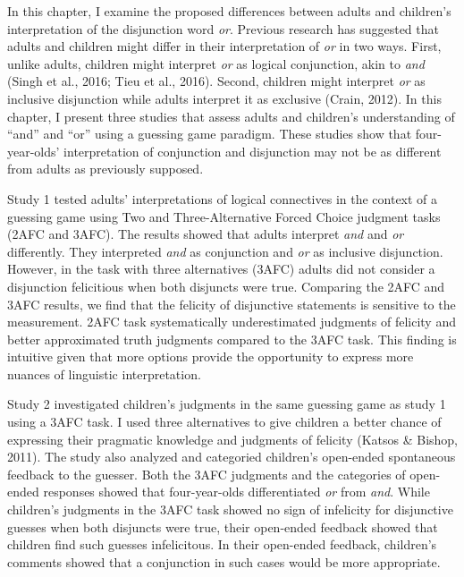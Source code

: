\documentclass[oneside]{report}
\theoremstyle{definition}
\theoremstyle{definition}
\theoremstyle{definition}
\theoremstyle{remark}
\begin{document}
In this chapter, I examine the proposed differences between adults and
children's interpretation of the disjunction word \emph{or}. Previous
research has suggested that adults and children might differ in their
interpretation of \emph{or} in two ways. First, unlike adults, children
might interpret \emph{or} as logical conjunction, akin to \emph{and}
(Singh et al., 2016; Tieu et al., 2016). Second, children might
interpret \emph{or} as inclusive disjunction while adults interpret it
as exclusive (Crain, 2012). In this chapter, I present three studies
that assess adults and children's understanding of ``and'' and ``or''
using a guessing game paradigm. These studies show that four-year-olds'
interpretation of conjunction and disjunction may not be as different
from adults as previously supposed.

Study 1 tested adults' interpretations of logical connectives in the
context of a guessing game using Two and Three-Alternative Forced Choice
judgment tasks (2AFC and 3AFC). The results showed that adults interpret
\emph{and} and \emph{or} differently. They interpreted \emph{and} as
conjunction and \emph{or} as inclusive disjunction. However, in the task
with three alternatives (3AFC) adults did not consider a disjunction
felicitious when both disjuncts were true. Comparing the 2AFC and 3AFC
results, we find that the felicity of disjunctive statements is
sensitive to the measurement. 2AFC task systematically underestimated
judgments of felicity and better approximated truth judgments compared
to the 3AFC task. This finding is intuitive given that more options
provide the opportunity to express more nuances of linguistic
interpretation.

Study 2 investigated children's judgments in the same guessing game as
study 1 using a 3AFC task. I used three alternatives to give children a
better chance of expressing their pragmatic knowledge and judgments of
felicity (Katsos \& Bishop, 2011). The study also analyzed and
categoried children's open-ended spontaneous feedback to the guesser.
Both the 3AFC judgments and the categories of open-ended responses
showed that four-year-olds differentiated \emph{or} from \emph{and}.
While children's judgments in the 3AFC task showed no sign of infelicity
for disjunctive guesses when both disjuncts were true, their open-ended
feedback showed that children find such guesses infelicitous. In their
open-ended feedback, children's comments showed that a conjunction in
such cases would be more appropriate.
\end{document}
